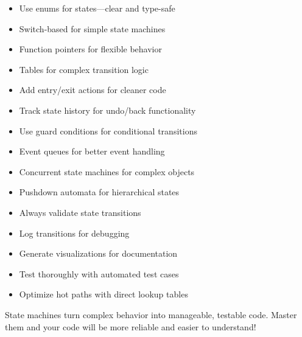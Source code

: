 \begin{itemize}
    \item Use enums for states---clear and type-safe
    \item Switch-based for simple state machines
    \item Function pointers for flexible behavior
    \item Tables for complex transition logic
    \item Add entry/exit actions for cleaner code
    \item Track state history for undo/back functionality
    \item Use guard conditions for conditional transitions
    \item Event queues for better event handling
    \item Concurrent state machines for complex objects
    \item Pushdown automata for hierarchical states
    \item Always validate state transitions
    \item Log transitions for debugging
    \item Generate visualizations for documentation
    \item Test thoroughly with automated test cases
    \item Optimize hot paths with direct lookup tables
\end{itemize}

State machines turn complex behavior into manageable, testable code. Master them and your code will be more reliable and easier to understand!

